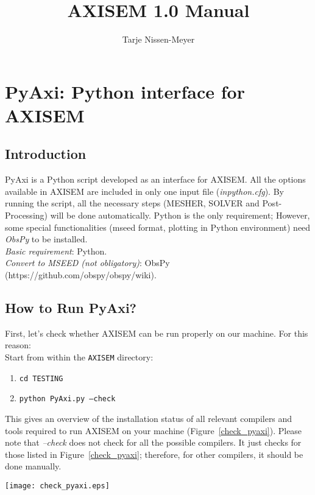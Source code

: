 \documentclass[11pt,letter,fleqn,english,notitlepage]{article}
\title{AXISEM 1.0 Manual}
\author{Tarje Nissen-Meyer}
\begin{document}
%
\pagestyle{fancy}
\thispagestyle{empty}
%

\section{PyAxi: Python interface for AXISEM}

\subsection{Introduction}
PyAxi is a Python script developed as an interface for AXISEM. 
All the options available in AXISEM are included in only one input file (\textit{inpython.cfg}).
By running the script, all the necessary steps (MESHER, SOLVER and Post-Processing) will be done automatically.
Python is the only requirement; However, some special functionalities (mseed format, plotting in Python environment) need \textit{ObsPy} to be installed. \\

\noindent \textit{Basic requirement}: Python.\\
\textit{Convert to MSEED (not obligatory)}: ObsPy (https://github.com/obspy/obspy/wiki).\\

\subsection{How to Run PyAxi?}
First, let's check whether AXISEM can be run properly on our machine. 
For this reason:\\

Start from within the {\tt AXISEM} directory:
\begin{enumerate}
\itemsep0em
\item {\tt cd TESTING}
\item {\tt python PyAxi.py --check}
\end{enumerate}
\noindent This gives an overview of the installation status of all relevant compilers and tools required
to run AXISEM on your machine (Figure~\ref{check_pyaxi}). 
Please note that \textit{--check} does not check for all the possible compilers.
It just checks for those listed in Figure~\ref{check_pyaxi}; 
therefore, for other compilers, it should be done manually.\\

\begin{figure*}[htb]
\begin{center}
\texttt{[image: check\_pyaxi.eps]}
\end{center}
\caption{\textit{Checking all the relevant compilers and tools required to run AXISEM.}}
\label{check_pyaxi}
\end{figure*}
\end{document}
